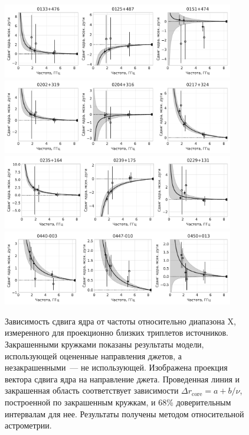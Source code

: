 \begin{figure}
 \centering
 \includegraphics[width=0.9\textwidth]{freqdep/0}
 \includegraphics[width=0.9\textwidth]{freqdep/1}
 \includegraphics[width=0.9\textwidth]{freqdep/2}
 \includegraphics[width=0.9\textwidth]{freqdep/3}
 \caption{Зависимость сдвига ядра от частоты относительно диапазона X, измеренного для проекционно
близких триплетов источников. Закрашенными кружками показаны результаты модели, использующей
оцененные направления джетов, а незакрашенными~--- не использующей. Изображена проекция вектора
сдвига ядра на направление джета. Проведенная линия и закрашенная область соответствует зависимости
$\Delta r_\text{core} = a + b/\nu$, построенной по закрашенным кружкам, и 68\% доверительным
интервалам для нее. Результаты получены методом относительной астрометрии.}
 \label{fig:cs_freqdep_astrom}
\end{figure}

